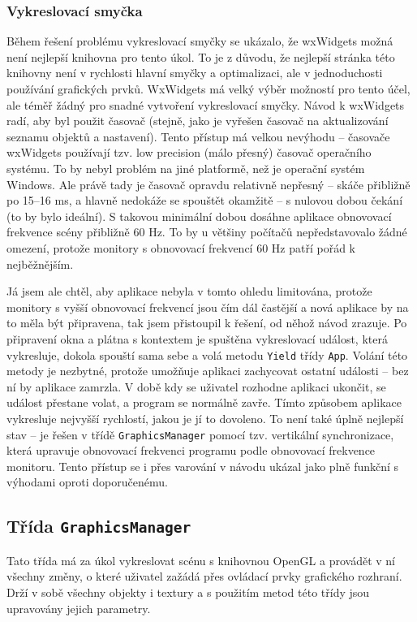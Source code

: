 \documentclass[a4paper, 12pt]{report}
\begin{document}
\subsubsection{Vykreslovací smyčka}
Během řešení problému vykreslovací smyčky se ukázalo, že wxWidgets možná není nejlepší knihovna pro tento úkol. To je z důvodu, že nejlepší stránka této knihovny není v rychlosti hlavní smyčky a optimalizaci, ale v jednoduchosti používání grafických prvků. WxWidgets má velký výběr možností pro tento účel, ale téměř žádný pro snadné vytvoření vykreslovací smyčky. Návod k wxWidgets radí, aby byl použit časovač (stejně, jako je vyřešen časovač na aktualizování seznamu objektů a nastavení)\cite{wx:render}. Tento přístup má velkou nevýhodu -- časovače wxWidgets používají tzv. low precision (málo přesný) časovač operačního systému. To by nebyl problém na jiné platformě, než je operační systém Windows. Ale právě tady je časovač opravdu relativně nepřesný -- skáče přibližně po 15--16 ms\cite{ms:timer}, a hlavně nedokáže se spouštět okamžitě -- s nulovou dobou čekání (to by bylo ideální). S takovou minimální dobou dosáhne aplikace obnovovací frekvence scény přibližně 60 Hz. To by u většiny počítačů nepředstavovalo žádné omezení, protože monitory s obnovovací frekvencí 60 Hz patří pořád k nejběžnějším.

Já jsem ale chtěl, aby aplikace nebyla v tomto ohledu limitována, protože monitory s vyšší obnovovací frekvencí jsou čím dál častější a nová aplikace by na to měla být připravena, tak jsem přistoupil k řešení, od něhož návod zrazuje. Po připravení okna a plátna s kontextem je spuštěna vykreslovací událost, která vykresluje, dokola spouští sama sebe a volá metodu \texttt{Yield} třídy \texttt{App}. Volání této metody je nezbytné, protože umožňuje aplikaci zachycovat ostatní události -- bez ní by aplikace zamrzla. V době kdy se uživatel rozhodne aplikaci ukončit, se událost přestane volat, a program se normálně zavře. Tímto způsobem aplikace vykresluje nejvyšší rychlostí, jakou je jí to dovoleno. To není také úplně nejlepší stav -- je řešen v třídě \texttt{GraphicsManager} pomocí tzv. vertikální synchronizace, která upravuje obnovovací frekvenci programu podle obnovovací frekvence monitoru. Tento přístup se i přes varování v návodu ukázal jako plně funkční s výhodami oproti doporučenému.

\subsection{Třída \texttt{GraphicsManager}}
Tato třída má za úkol vykreslovat scénu s knihovnou OpenGL a provádět v ní všechny změny, o které uživatel zažádá přes ovládací prvky grafického rozhraní. Drží v sobě všechny objekty i textury a s použitím metod této třídy jsou upravovány jejich parametry.
\end{document}
